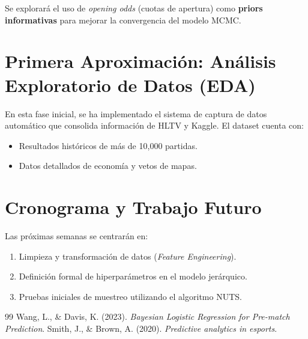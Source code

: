 \documentclass[12pt,a4paper]{article}
\begin{document}
Se explorará el uso de \textit{opening odds} (cuotas de apertura) como \textbf{priors informativas} para mejorar la convergencia del modelo MCMC.

\section{Primera Aproximación: Análisis Exploratorio de Datos (EDA)}
En esta fase inicial, se ha implementado el sistema de captura de datos automático que consolida información de HLTV y Kaggle. El dataset cuenta con:
\begin{itemize}
    \item Resultados históricos de más de 10,000 partidas.
    \item Datos detallados de economía y vetos de mapas.
\end{itemize}

\section{Cronograma y Trabajo Futuro}
Las próximas semanas se centrarán en:
\begin{enumerate}
    \item Limpieza y transformación de datos (\textit{Feature Engineering}).
    \item Definición formal de hiperparámetros en el modelo jerárquico.
    \item Pruebas iniciales de muestreo utilizando el algoritmo NUTS.
\end{enumerate}


\begin{thebibliography}{99}
     Wang, L., \& Davis, K. (2023). \textit{Bayesian Logistic Regression for Pre-match Prediction}.
     Smith, J., \& Brown, A. (2020). \textit{Predictive analytics in esports}.
\end{thebibliography}
\end{document}
